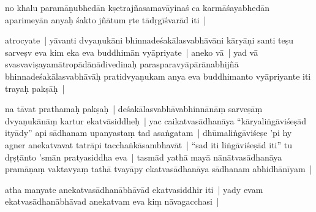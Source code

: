\documentclass[article,12pt,a4paper]{memoir}
\newcommand{\gap}[1]{}
\begin{document}
	  \pstart no khalu paramāṇubhedān kṣetrajñasamavāyinaś ca karmāśayabhedān aparimeyān anyaḥ śakto jñātum ṛte tādṛgīśvarād\label{ratnakīrtinibandhāvali__36r1NJ1HHMVH5RR7U2GTVWCF63V} iti |
	\pend
      

	  \pstart atrocyate | yāvanti dvyaṇukāni bhinnadeśakālasvabhāvāni kāryāṇi santi teṣu sarveṣv eva kim eka eva buddhimān vyāpriyate | aneko vā | yad vā svasvaviṣayamātropādānādivedinaḥ parasparavyāpārānabhijñā bhinnadeśakālasvabhāvāḥ pratidvyaṇukam anya eva buddhimanto vyāpriyante iti trayaḥ pakṣāḥ |
	\pend
      

	  \pstart na tāvat \label{ratnakīrtinibandhāvali__36r1NM7W6RLH3UQ01ZEG4Q53FWC}prathamaḥ pakṣaḥ |\label{ratnakīrtinibandhāvali__36r1NM7W6SG03AESJNSHQ1FK1L5} de\gap{}śakālasvabhāvabhinnānāṃ sarveṣāṃ dvyaṇukānāṃ kartur ekatvāsiddheḥ | yac caikatvasādhanāya “kāryaliṅgāviśeṣād ityādy” api sādhanam upanyastaṃ tad asaṅgatam | dhūmaliṅgāviśeṣe 'pi hy agner anekatvavat tatrāpi tacchaṅkāsambhavāt | “\label{ratnakīrtinibandhāvali__36r1NSAWNTV0PU093F550ENXSD2}sad iti liṅgāviśeṣād\label{ratnakīrtinibandhāvali__36r1NSAWNTWQ48AKDPN5RIVJIC3} iti” tu dṛṣṭānto 'smān pratyasiddha eva | tasmād yathā mayā nānātvasādhanāya pramāṇaṃ vaktavyaṃ tathā tvayāpy ekatvasādhanāya sādhanam abhidhānīyam |
	\pend
      

	  \pstart atha manyate anekatvasādhanābhāvād ekatvasiddhir iti | yady evam ekatvasādhanābhāvad anekatvam eva kiṃ nāvagacchasi |
	\pend
      
\end{document}
